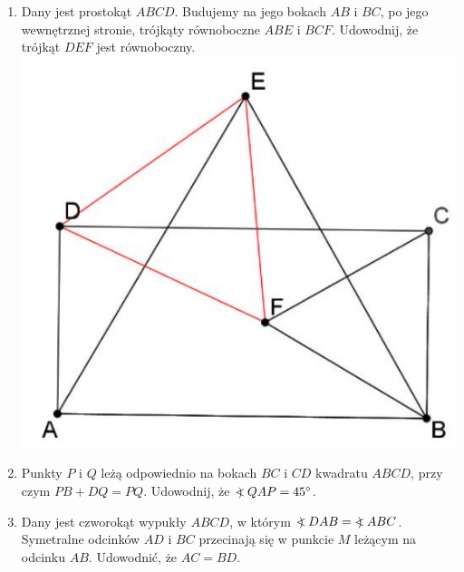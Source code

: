 \documentclass[10pt]{article}
\newcommand\Varangle{\mathop{{<\!\!\!\!\!\text{\small)}}\:}\nolimits}
\begin{document}
\begin{enumerate}
  \item Dany jest prostokąt \(A B C D\). Budujemy na jego bokach \(A B\) i \(B C\), po jego wewnętrznej stronie, trójkąty równoboczne \(A B E\) i \(B C F\). Udowodnij, że trójkąt \(D E F\) jest równoboczny.\\
\includegraphics[max width=\textwidth, center]{2024_11_21_a3b3d3b4a87def3715fbg-1}
  \item Punkty \(P\) i \(Q\) leżą odpowiednio na bokach \(B C\) i \(C D\) kwadratu \(A B C D\), przy czym \(P B+D Q=P Q\). Udowodnij, że \(\Varangle Q A P=45^{\circ}\).
  \item Dany jest czworokąt wypukły \(A B C D\), w którym \(\Varangle D A B=\Varangle A B C\). Symetralne odcinków \(A D\) i \(B C\) przecinają się w punkcie \(M\) leżącym na odcinku \(A B\). Udowodnić, że \(A C=B D\).\\

\end{enumerate}
\end{document}
